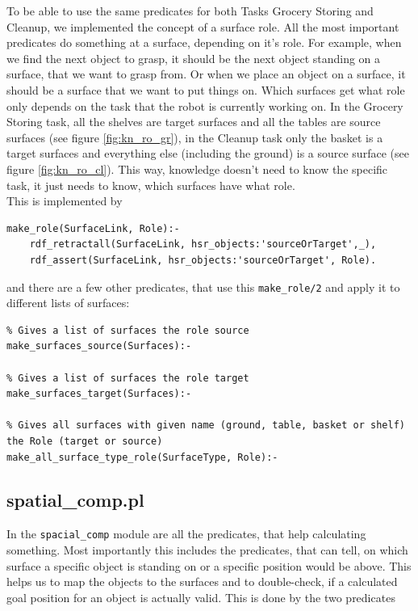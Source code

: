 \documentclass[main.tex]{subfiles}
\begin{document}
To be able to use the same predicates for both Tasks Grocery Storing and Cleanup, we implemented the concept of a surface role. All the most important predicates do something at a surface, depending on it's role. For example, when we find the next object to grasp, it should be the next object standing on a surface, that we want to grasp from. Or when we place an object on a surface, it should be a surface that we want to put things on. Which surfaces get what role only depends on the task that the robot is currently working on. In the Grocery Storing task, all the shelves are target surfaces and all the tables are source surfaces (see figure \ref{fig:kn_ro_gr}), in the Cleanup task only the basket is a target surfaces and everything else (including the ground) is a source surface (see figure \ref{fig:kn_ro_cl}). This way, knowledge doesn't need to know the specific task, it just needs to know, which surfaces have what role.\\
This is implemented by 

\begin{lstlisting}
make_role(SurfaceLink, Role):-
    rdf_retractall(SurfaceLink, hsr_objects:'sourceOrTarget',_),
    rdf_assert(SurfaceLink, hsr_objects:'sourceOrTarget', Role).
\end{lstlisting}
and there are a few other predicates, that use this \texttt{make\_role/2} and apply it to different lists of surfaces:
\begin{lstlisting}
% Gives a list of surfaces the role source
make_surfaces_source(Surfaces):-

% Gives a list of surfaces the role target
make_surfaces_target(Surfaces):-

% Gives all surfaces with given name (ground, table, basket or shelf) the Role (target or source)
make_all_surface_type_role(SurfaceType, Role):-
\end{lstlisting}


\subsection{spatial\_comp.pl}

In the \texttt{spacial\_comp} module are all the predicates, that help calculating something. Most importantly this includes the predicates, that can tell, on which surface a specific object is standing on or a specific position would be above. This helps us to map the objects to the surfaces and to double-check, if a calculated goal position for an object is actually valid. This is done by the two predicates
\end{document}

